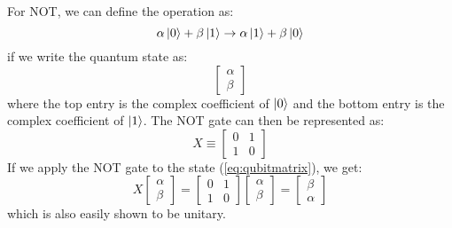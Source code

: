 \documentclass[reqno]{amsart}
\numberwithin{equation}{section}
\numberwithin{figure}{section}
\begin{document}
\begin{justify}
For NOT, we can define the operation as:
    \begin{equation}
        \alpha\ket{0} + \beta\ket{1} \rightarrow \alpha\ket{1} + \beta\ket{0}
    \end{equation}
if we write the quantum state as:
    \begin{equation}
        \begin{bmatrix}
            \alpha \\
            \beta
        \end{bmatrix}
        \label{eq:qubitmatrix}
    \end{equation}
where the top entry is the complex coefficient of $\ket{0}$ and the bottom entry is the complex coefficient of $\ket{1}$. The NOT gate can then be represented as:
    \begin{equation}
        X \equiv \begin{bmatrix}
                    0 & 1 \\
                    1 & 0
                \end{bmatrix}
                \label{eq:NOTmatrix}
    \end{equation}
If we apply the NOT gate to the state (\ref{eq:qubitmatrix}), we get:
    \begin{equation}
        X\begin{bmatrix}
            \alpha \\
            \beta
        \end{bmatrix} = \begin{bmatrix}
                            0 & 1 \\
                            1 & 0
                        \end{bmatrix}\begin{bmatrix}
                                        \alpha \\
                                        \beta
                                    \end{bmatrix} = \begin{bmatrix}
                                                        \beta \\
                                                        \alpha
                                                    \end{bmatrix}
    \end{equation}
which is also easily shown to be unitary. \\


\end{justify}
\end{document}
